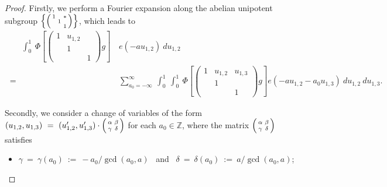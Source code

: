 \documentclass[11pt,reqno]{amsart}
\theoremstyle{definition}
\theoremstyle{definition}
\theoremstyle{remark}
\newcommand{\Z}{\ensuremath{\mathbb{Z}}}
\numberwithin{equation}{section}
\begin{document}
 
 \begin{proof}
 Firstly, we perform a Fourier expansion  along the abelian unipotent  subgroup
 	$\left\{\begin{psmallmatrix}
 		1 &    & * \\
 		& 1 &   \\
 		&    & 1
 	\end{psmallmatrix}\right\}$, which leads to
 	\begin{align}
 	\hspace{20pt}	\int_{0}^{1}  \ \Phi\left[
 		\begin{pmatrix}
 			1 & u_{1,2} &  \\
 			& 1 & \\
 			&    & 1
 		\end{pmatrix} g\right]\,  & e(-au_{1,2}) \ du_{1,2} \nonumber\\
 		\ = \ &  \sum_{a_{0}=-\infty}^{\infty} \ 	\int_{0}^{1}  \ 	\int_{0}^{1}   \ \Phi\left[
 		\begin{pmatrix}
 			1 & u_{1,2} & u_{1,3}  \\
 			& 1          & \\
 			&             & 1
 		\end{pmatrix} g\right] e(-au_{1,2}-a_{0} u_{1,3}) \ du_{1,2} \ du_{1,3}. 
 	\end{align}
 	
 Secondly,  we consider a change of variables of the form $(u_{1,2}, u_{1,3}) \ = \  (u_{1,2}', u_{1,3}') \cdot \begin{psmallmatrix}
 		\alpha     & \beta \\
 		\gamma &\delta
 	\end{psmallmatrix}$ for each $a_{0}\in \Z$, where the matrix $\begin{psmallmatrix}
 		\alpha     & \beta \\
 		\gamma &\delta
 	\end{psmallmatrix} $ satisfies
  \begin{itemize}
 	\item  $	\gamma \ = \ \gamma(a_{0}) \ := \  -a_{0}/ \gcd\left(a_{0}, a\right)$ \ and \ $\delta \ = \ \delta(a_{0}) \ := \ a/\gcd\left(a_{0}, a\right)$;
 	

\end{itemize}
\end{proof}
\end{document}
